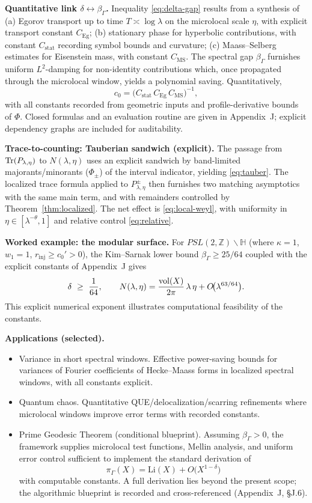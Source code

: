 \medskip
\noindent\textbf{Quantitative link $\delta\leftrightarrow\beta_\Gamma$.}
Inequality \eqref{eq:delta-gap} results from a synthesis of (a) Egorov transport up to time $T\asymp\log\lambda$ on the microlocal scale $\eta$, with explicit transport constant $C_{\mathrm{Eg}}$; (b) stationary phase for hyperbolic contributions, with constant $C_{\mathrm{stat}}$ recording symbol bounds and curvature; (c) Maass--Selberg estimates for Eisenstein mass, with constant $C_{\mathrm{MS}}$. The spectral gap $\beta_\Gamma$ furnishes uniform $L^2$-damping for non-identity contributions which, once propagated through the microlocal window, yields a polynomial saving. Quantitatively,
\[
c_0=\Big(C_{\mathrm{stat}}\,C_{\mathrm{Eg}}\,C_{\mathrm{MS}}\Big)^{-1},
\]
with all constants recorded from geometric inputs and profile-derivative bounds of $\Phi$. Closed formulas and an evaluation routine are given in Appendix~J; explicit dependency graphs are included for auditability.

\medskip
\noindent\textbf{Trace-to-counting: Tauberian sandwich (explicit).}
The passage from $\operatorname{Tr}(P_{\lambda,\eta})$ to $N(\lambda,\eta)$ uses an explicit sandwich by band-limited majorants/minorants ($\Phi_\pm$) of the interval indicator, yielding \eqref{eq:tauber}. The localized trace formula applied to $P^\pm_{\lambda,\eta}$ then furnishes two matching asymptotics with the same main term, and with remainders controlled by Theorem~\ref{thm:localized}. The net effect is \eqref{eq:local-weyl}, with uniformity in $\eta\in[\lambda^{-\theta},1]$ and relative control \eqref{eq:relative}.

\medskip
\noindent\textbf{Worked example: the modular surface.}
For $PSL(2,\mathbb{Z})\backslash\mathbb{H}$ (where $\kappa=1$, $w_1=1$, $r_{\mathrm{inj}}\ge c_0'>0$), the Kim--Sarnak lower bound $\beta_\Gamma\ge 25/64$ coupled with the explicit constants of Appendix~J gives
\[
\delta\ \ge\ \frac{1}{64},\qquad 
N(\lambda,\eta)=\frac{\operatorname{vol}(X)}{2\pi}\,\lambda\,\eta + O\!\big(\lambda^{63/64}\big).
\]
This explicit numerical exponent illustrates computational feasibility of the constants.

\medskip
\noindent\textbf{Applications (selected).}
\begin{itemize}
\item Variance in short spectral windows. Effective power-saving bounds for variances of Fourier coefficients of Hecke--Maass forms in localized spectral windows, with all constants explicit.
\item Quantum chaos. Quantitative QUE/delocalization/scarring refinements where microlocal windows improve error terms with recorded constants.
\item Prime Geodesic Theorem (conditional blueprint). Assuming $\beta_\Gamma>0$, the framework supplies microlocal test functions, Mellin analysis, and uniform error control sufficient to implement the standard derivation of
\[
\pi_\Gamma(X)=\mathrm{Li}(X)+O\!\big(X^{1-\delta}\big)
\]
with computable constants. A full derivation lies beyond the present scope; the algorithmic blueprint is recorded and cross-referenced (Appendix~J, \S J.6).
\end{itemize}

